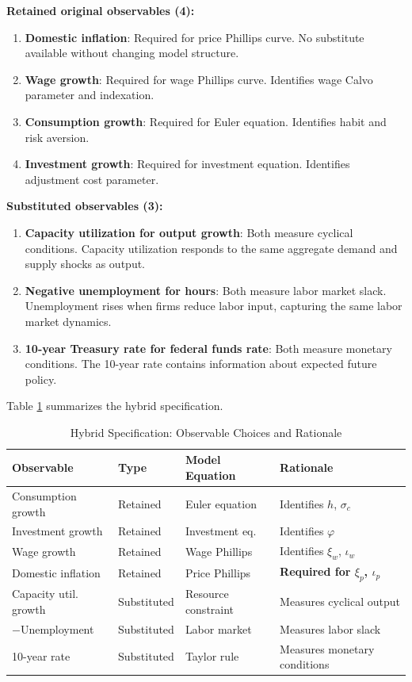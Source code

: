 \documentclass[12pt]{article}
\begin{document}
\textbf{Retained original observables (4):}
\begin{enumerate}
    \item \textbf{Domestic inflation}: Required for price Phillips curve. No substitute available without changing model structure.
    \item \textbf{Wage growth}: Required for wage Phillips curve. Identifies wage Calvo parameter and indexation.
    \item \textbf{Consumption growth}: Required for Euler equation. Identifies habit and risk aversion.
    \item \textbf{Investment growth}: Required for investment equation. Identifies adjustment cost parameter.
\end{enumerate}

\textbf{Substituted observables (3):}
\begin{enumerate}
    \item \textbf{Capacity utilization for output growth}: Both measure cyclical conditions. Capacity utilization responds to the same aggregate demand and supply shocks as output.
    \item \textbf{Negative unemployment for hours}: Both measure labor market slack. Unemployment rises when firms reduce labor input, capturing the same labor market dynamics.
    \item \textbf{10-year Treasury rate for federal funds rate}: Both measure monetary conditions. The 10-year rate contains information about expected future policy.
\end{enumerate}

Table \ref{tab:hybrid_spec} summarizes the hybrid specification.

\begin{table}[H]
\centering
\caption{Hybrid Specification: Observable Choices and Rationale}
\label{tab:hybrid_spec}
\begin{tabular}{llll}
\toprule
Observable & Type & Model Equation & Rationale \\
\midrule
Consumption growth & Retained & Euler equation & Identifies $h$, $\sigma_c$ \\
Investment growth & Retained & Investment eq. & Identifies $\varphi$ \\
Wage growth & Retained & Wage Phillips & Identifies $\xi_w$, $\iota_w$ \\
Domestic inflation & Retained & Price Phillips & \textbf{Required for $\xi_p$, $\iota_p$} \\
\midrule
Capacity util. growth & Substituted & Resource constraint & Measures cyclical output \\
$-$Unemployment & Substituted & Labor market & Measures labor slack \\
10-year rate & Substituted & Taylor rule & Measures monetary conditions \\
\bottomrule
\end{tabular}
\end{table}
\end{document}
